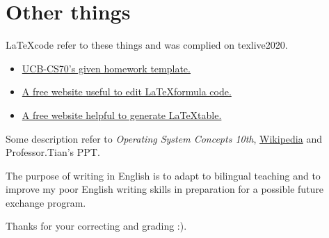 \documentclass[11pt]{article}
\begin{document}
\section*{Other things}

    \LaTeX \space code refer to these things and was complied on texlive2020.
    \begin{itemize}
        \item  \href{https://www.eecs70.org/assets/misc/homework_template.tex}{UCB-CS70's given homework template.} 
        \item  \href{https://www.latexlive.com}{A free website useful to edit \LaTeX \space formula code.}
        \item  \href{https://www.tablesgenerator.com/}{A free website helpful to generate \LaTeX \space table.}
    \end{itemize}

    Some description refer to \textit{Operating System Concepts 10th}, \href{https://en.wikipedia.org}{Wikipedia} and Professor.Tian's PPT.

    The purpose of writing in English is to adapt to bilingual teaching and to improve my poor English 
    writing skills in preparation for a possible future exchange program. 

    Thanks for your correcting and grading :).
\end{document}
